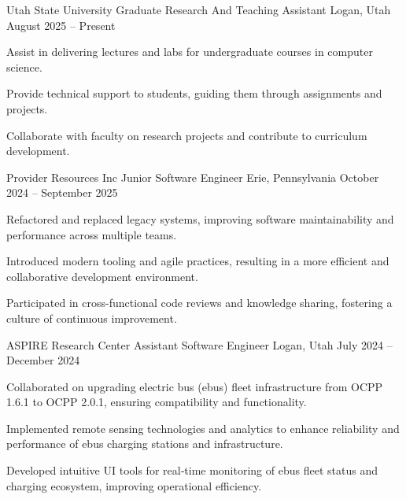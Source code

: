\documentclass[10pt, a4paper]{russell}
\begin{document}
\begin{cventries}

    \cventry
        {Utah State University}
        {Graduate Research And Teaching Assistant}
        {Logan, Utah}
        {August 2025 – Present}
        {
            \begin{cvitems}
                \item Assist in delivering lectures and labs for undergraduate courses in computer science.
                \item Provide technical support to students, guiding them through assignments and projects.
                \item Collaborate with faculty on research projects and contribute to curriculum development.
            \end{cvitems}
        }

    \cventry
        {Provider Resources Inc}
        {Junior Software Engineer}
        {Erie, Pennsylvania}
        {October 2024 – September 2025}
        {
            \begin{cvitems}
                \item Refactored and replaced legacy systems, improving software maintainability and performance across multiple teams.
                \item Introduced modern tooling and agile practices, resulting in a more efficient and collaborative development environment.
                \item Participated in cross-functional code reviews and knowledge sharing, fostering a culture of continuous improvement.
            \end{cvitems}
        }

    \cventry
        {ASPIRE Research Center}
        {Assistant Software Engineer}
        {Logan, Utah}
        {July 2024 – December 2024}
        {
            \begin{cvitems}
                \item Collaborated on upgrading electric bus (ebus) fleet infrastructure from OCPP 1.6.1 to OCPP 2.0.1, ensuring compatibility and functionality.
                \item Implemented remote sensing technologies and analytics to enhance reliability and performance of ebus charging stations and infrastructure.
                \item Developed intuitive UI tools for real‑time monitoring of ebus fleet status and charging ecosystem, improving operational efficiency.
            \end{cvitems}
        }

\end{cventries}
\end{document}
